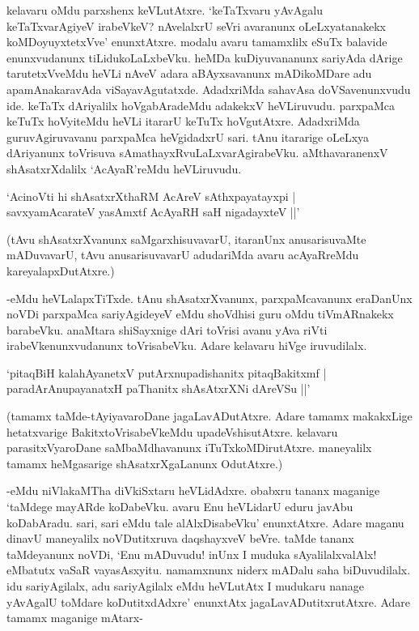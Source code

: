 kelavaru oMdu parxshenx keVLutAtxre. `keTaTxvaru yAvAgalu keTaTxvarAgiyeV irabeVkeV? nAvelalxrU seVri avaranunx oLeLxyatanakekx koMDoyuyxtetxVve' enunxtAtxre. modalu avaru tamamxlilx eSuTx balavide enunxvudanunx tiLidukoLaLxbeVku. heMDa kuDiyuvananunx sariyAda dArige tarutetxVveMdu heVLi nAveV adara aBAyxsavanunx mADikoMDare adu apamAnakaravAda viSayavAgutatxde. AdadxriMda sahavAsa doVSavenunxvudu ide. keTaTx dAriyalilx hoVgabAradeMdu adakekxV heVLiruvudu. parxpaMca keTuTx hoVyiteMdu heVLi itararU keTuTx hoVgutAtxre. AdadxriMda guruvAgiruvavanu parxpaMca heVgidadxrU sari. tAnu itararige oLeLxya dAriyanunx toVrisuva sAmathayxRvuLaLxvarAgirabeVku. aMthavaranenxV shAsatxrXdalilx `AcAyaR'reMdu heVLiruvudu. 

\begin{shloka} 
`AcinoVti hi shAsatxrXthaRM AcAreV sAthxpayatayxpi |\\
savxyamAcarateV yasAmxtf AcAyaRH saH nigadayxteV ||'
\end{shloka}

(tAvu shAsatxrXvanunx saMgarxhisuvavarU, itaranUnx anusarisuvaMte mADuvavarU, tAvu anusarisuvavarU adudariMda avaru acAyaRreMdu kareyalapxDutAtxre.)

-eMdu heVLalapxTiTxde. tAnu shAsatxrXvanunx, parxpaMcavanunx eraDanUnx noVDi parxpaMca sariyAgideyeV eMdu shoVdhisi guru oMdu tiVmARnakekx barabeVku. anaMtara shiSayxnige dAri toVrisi avanu yAva riVti irabeVkenunxvudanunx toVrisabeVku. Adare kelavaru hiVge iruvudilalx. 


\begin{shloka}
`pitaqBiH kalahAyanetxV putArxnupadishanitx pitaqBakitxmf |\\
paradArAnupayanatxH paThanitx shAsAtxrXNi dAreVSu ||'
\end{shloka}

(tamamx taMde-tAyiyavaroDane jagaLavADutAtxre. Adare tamamx makakxLige hetatxvarige BakitxtoVrisabeVkeMdu upadeVshisutAtxre. kelavaru parasitxVyaroDane saMbaMdhavanunx iTuTxkoMDirutAtxre. maneyalilx tamamx heMgasarige shAsatxrXgaLanunx OdutAtxre.)

-eMdu niVlakaMTha diVkiSxtaru heVLidAdxre. obabxru tananx maganige `taMdege mayARde koDabeVku. avaru Enu heVLidarU eduru javAbu koDabAradu. sari, sari eMdu tale alAlxDisabeVku' enunxtAtxre. Adare maganu dinavU maneyalilx noVDutitxruva daqshayxveV beVre. taMde tananx taMdeyanunx noVDi, `Enu mADuvudu! inUnx I muduka sAyalilalxvalAlx! eMbatutx vaSaR vayasAsxyitu. namamxnunx niderx mADalu saha biDuvudilalx. idu sariyAgilalx, adu sariyAgilalx eMdu heVLutAtx I mudukaru nanage yAvAgalU toMdare koDutitxdAdxre' enunxtAtx jagaLavADutitxrutAtxre. Adare tamamx maganige mAtarx-

